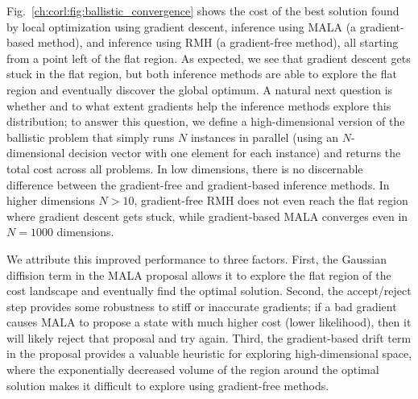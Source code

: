 Fig.~\ref{ch:corl:fig:ballistic_convergence} shows the cost of the best solution found by local optimization using gradient descent, inference using MALA (a gradient-based method), and inference using RMH (a gradient-free method), all starting from a point left of the flat region. As expected, we see that gradient descent gets stuck in the flat region, but both inference methods are able to explore the flat region and eventually discover the global optimum. A natural next question is whether and to what extent gradients help the inference methods explore this distribution; to answer this question, we define a high-dimensional version of the ballistic problem that simply runs $N$ instances in parallel (using an $N$-dimensional decision vector with one element for each instance) and returns the total cost across all problems. In low dimensions, there is no discernable difference between the gradient-free and gradient-based inference methods. In higher dimensions $N > 10$, gradient-free RMH does not even reach the flat region where gradient descent gets stuck, while gradient-based MALA converges even in $N=1000$ dimensions.

We attribute this improved performance to three factors. First, the Gaussian diffision term in the MALA proposal allows it to explore the flat region of the cost landscape and eventually find the optimal solution. Second, the accept/reject step provides some robustness to stiff or inaccurate gradients; if a bad gradient causes MALA to propose a state with much higher cost (lower likelihood), then it will likely reject that proposal and try again. Third, the gradient-based drift term in the proposal provides a valuable heuristic for exploring high-dimensional space, where the exponentially decreased volume of the region around the optimal solution makes it difficult to explore using gradient-free methods.

